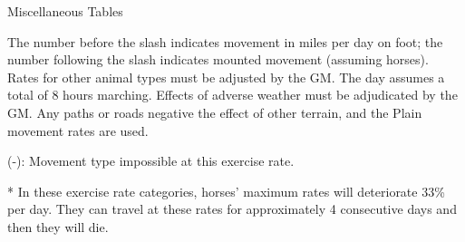 \begin{Tables}{Miscellaneous Tables}
\begin{multicols}{2}
The number before the slash indicates movement in miles per day on
foot; the number following the slash indicates mounted movement
(assuming horses). Rates for other animal types must be adjusted by
the GM.  The day assumes a total of 8 hours marching. Effects of
adverse weather must be adjudicated by the GM.  Any paths or roads
negative the effect of other terrain, and the Plain movement rates are
used.

(-): Movement type impossible at this exercise rate. 

* In these exercise rate categories, horses’ maximum rates will
deteriorate 33\% per day. They can travel at these rates for
approximately 4 consecutive days and then they will die.
\end{multicols}

\end{Tables}














































































